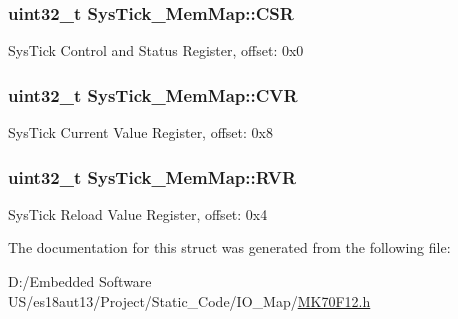 \subsubsection[{C\+S\+R}]{\setlength{\rightskip}{0pt plus 5cm}uint32\+\_\+t Sys\+Tick\+\_\+\+Mem\+Map\+::\+C\+S\+R}\label{struct_sys_tick___mem_map_aec23689880afd46876916055403e867a}
Sys\+Tick Control and Status Register, offset\+: 0x0 \hypertarget{struct_sys_tick___mem_map_a508dd628bc347f199e7baf4b1bfbfa0d}{}
\subsubsection[{C\+V\+R}]{\setlength{\rightskip}{0pt plus 5cm}uint32\+\_\+t Sys\+Tick\+\_\+\+Mem\+Map\+::\+C\+V\+R}\label{struct_sys_tick___mem_map_a508dd628bc347f199e7baf4b1bfbfa0d}
Sys\+Tick Current Value Register, offset\+: 0x8 \hypertarget{struct_sys_tick___mem_map_a3f2018b492fd4bc1d141a718d499e50f}{}
\subsubsection[{R\+V\+R}]{\setlength{\rightskip}{0pt plus 5cm}uint32\+\_\+t Sys\+Tick\+\_\+\+Mem\+Map\+::\+R\+V\+R}\label{struct_sys_tick___mem_map_a3f2018b492fd4bc1d141a718d499e50f}
Sys\+Tick Reload Value Register, offset\+: 0x4 

The documentation for this struct was generated from the following file\+:\begin{DoxyCompactItemize}
\item 
D\+:/\+Embedded Software U\+S/es18aut13/\+Project/\+Static\+\_\+\+Code/\+I\+O\+\_\+\+Map/\hyperlink{_m_k70_f12_8h}{M\+K70\+F12.\+h}\end{DoxyCompactItemize}
